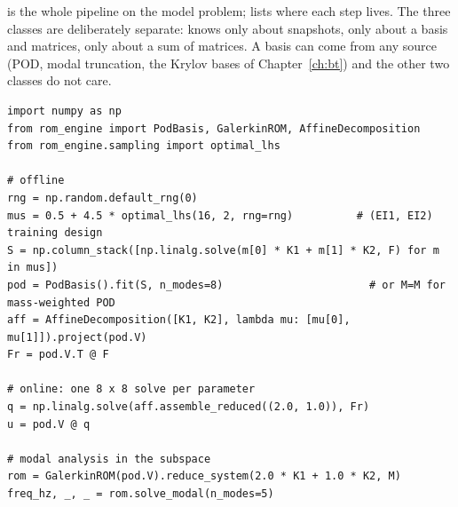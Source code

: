  is the whole pipeline on the model problem;  lists where each step lives. The three classes are deliberately separate:  knows only about snapshots,  only about a basis and matrices,  only about a sum of matrices. A basis can come from any source (POD, modal truncation, the Krylov bases of Chapter~\ref{ch:bt}) and the other two classes do not care.

\begin{lstlisting}[caption={Offline--online pipeline on the two-region beam (matrices K1, K2 are the dense free-dof blocks; theta is the coefficient function).},label={lst:pod-run}]
import numpy as np
from rom_engine import PodBasis, GalerkinROM, AffineDecomposition
from rom_engine.sampling import optimal_lhs

# offline
rng = np.random.default_rng(0)
mus = 0.5 + 4.5 * optimal_lhs(16, 2, rng=rng)          # (EI1, EI2) training design
S = np.column_stack([np.linalg.solve(m[0] * K1 + m[1] * K2, F) for m in mus])
pod = PodBasis().fit(S, n_modes=8)                       # or M=M for mass-weighted POD
aff = AffineDecomposition([K1, K2], lambda mu: [mu[0], mu[1]]).project(pod.V)
Fr = pod.V.T @ F

# online: one 8 x 8 solve per parameter
q = np.linalg.solve(aff.assemble_reduced((2.0, 1.0)), Fr)
u = pod.V @ q

# modal analysis in the subspace
rom = GalerkinROM(pod.V).reduce_system(2.0 * K1 + 1.0 * K2, M)
freq_hz, _, _ = rom.solve_modal(n_modes=5)
\end{lstlisting}

